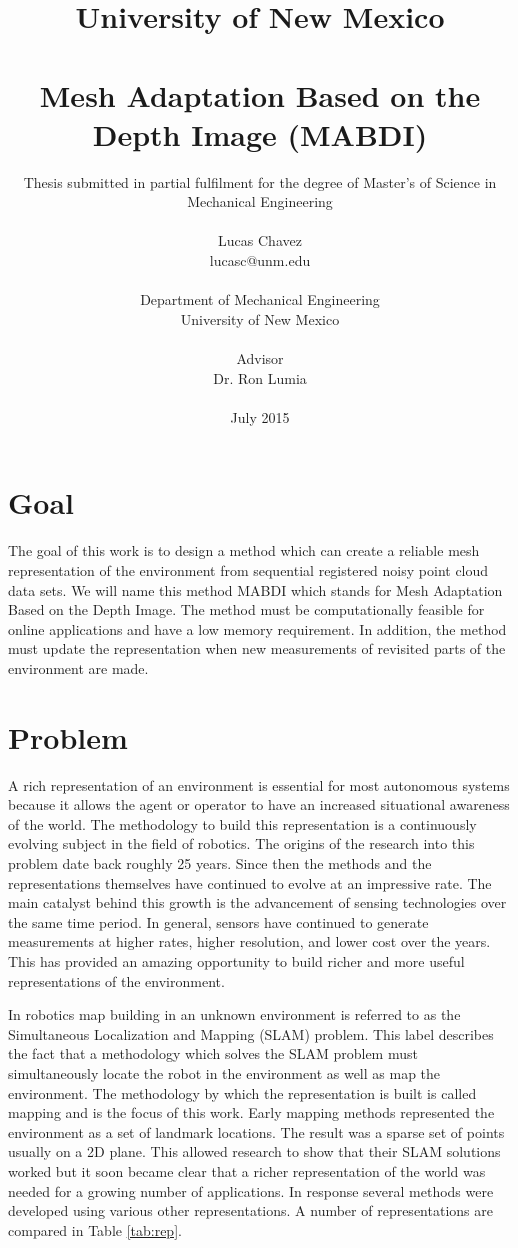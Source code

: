 \documentclass[12pt]{article}
\title{{\small University of New Mexico} \\ ~\\ 
Mesh Adaptation Based on the Depth Image (MABDI)}
\author{ 
\small Thesis submitted in partial fulfilment for the degree of Master’s of Science in Mechanical Engineering \\ ~\\
{Lucas Chavez}  \\
{\small lucasc@unm.edu} \\ ~\\
Department of Mechanical Engineering \\ 
University of New Mexico \\ ~\\
Advisor \\ Dr. Ron Lumia \\ ~\\
July 2015
}
\date{}
\begin{document}
\pagestyle{plain}
\maketitle

\pagebreak

\tableofcontents
\pagebreak

\cleardoublepage
{}

\section{Goal}
\label{ch:goal}

The goal of this work is to design a method which can create a reliable
mesh representation of the environment from sequential registered noisy
point cloud data sets. We will name this method MABDI which stands for Mesh
Adaptation Based on the Depth Image. The method must be computationally
feasible for online applications and have a low memory requirement. In
addition, the method must update the representation when new measurements of
revisited parts of the environment are made. 

\section{Problem}
\label{ch:problem}

A rich representation of an environment is essential for most autonomous
systems because it allows the agent or operator to have an increased
situational awareness of the world.  The methodology to build this
representation is a continuously evolving subject in the field of robotics.
The origins of the research into this problem date back roughly 25 years.
Since then the methods and the representations themselves have continued to
evolve at an impressive rate. The main catalyst behind this growth is the
advancement of sensing technologies over the same time period. In general,
sensors have continued to generate measurements at higher rates, higher
resolution, and lower cost over the years. This has provided an amazing
opportunity to build richer and more useful representations of the
environment.

In robotics map building in an unknown environment is referred to as
the Simultaneous Localization and Mapping (SLAM) problem. This label
describes the fact that a methodology which solves the SLAM problem must
simultaneously locate the robot in the environment as well as map the
environment. The methodology by which the representation is built is called
mapping and is the focus of this work. Early mapping methods represented
the environment as a set of landmark locations. The result was a sparse set
of points usually on a 2D plane. This allowed research to show that their
SLAM solutions worked but it soon became clear that a richer representation
of the world was needed for a growing number of applications. In response
several methods were developed using various other representations.  A
number of representations are compared in Table \ref{tab:rep}. 
\end{document}
